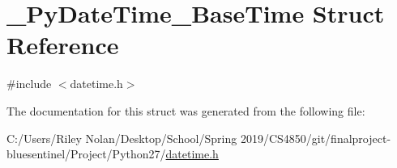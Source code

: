 \hypertarget{struct___py_date_time___base_time}{}\section{\+\_\+\+Py\+Date\+Time\+\_\+\+Base\+Time Struct Reference}
\label{struct___py_date_time___base_time}


{\ttfamily \#include $<$datetime.\+h$>$}



The documentation for this struct was generated from the following file\+:\begin{DoxyCompactItemize}
\item 
C\+:/\+Users/\+Riley Nolan/\+Desktop/\+School/\+Spring 2019/\+C\+S4850/git/finalproject-\/bluesentinel/\+Project/\+Python27/\mbox{\hyperlink{datetime_8h}{datetime.\+h}}\end{DoxyCompactItemize}
